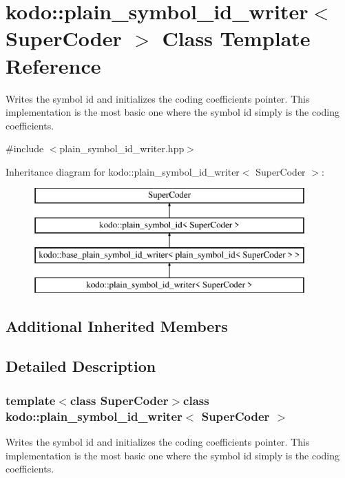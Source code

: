 \hypertarget{classkodo_1_1plain__symbol__id__writer}{\section{kodo\-:\-:plain\-\_\-symbol\-\_\-id\-\_\-writer$<$ Super\-Coder $>$ Class Template Reference}
\label{classkodo_1_1plain__symbol__id__writer}
}


Writes the symbol id and initializes the coding coefficients pointer. This implementation is the most basic one where the symbol id simply is the coding coefficients.  




{\ttfamily \#include $<$plain\-\_\-symbol\-\_\-id\-\_\-writer.\-hpp$>$}

Inheritance diagram for kodo\-:\-:plain\-\_\-symbol\-\_\-id\-\_\-writer$<$ Super\-Coder $>$\-:\begin{figure}[H]
\begin{center}
\leavevmode
\includegraphics[height=4.000000cm]{classkodo_1_1plain__symbol__id__writer}
\end{center}
\end{figure}
\subsection*{Additional Inherited Members}


\subsection{Detailed Description}
\subsubsection*{template$<$class Super\-Coder$>$class kodo\-::plain\-\_\-symbol\-\_\-id\-\_\-writer$<$ Super\-Coder $>$}

Writes the symbol id and initializes the coding coefficients pointer. This implementation is the most basic one where the symbol id simply is the coding coefficients. 


